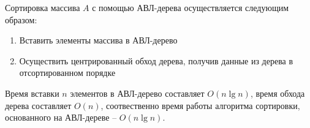 Сортировка массива $A$ с помощью АВЛ-дерева осуществляется следующим образом:
\begin{enumerate}
	\item{Вставить элементы массива в АВЛ-дерево}
	\item{Осуществить центрированный обход дерева\footnotemark, получив данные из дерева в отсортированном порядке}
\end{enumerate}


Время вставки $n$ элементов в АВЛ-дерево составляет $O(n\lg n)$, время обхода дерева составляет $O(n)$, соотвественно время работы алгоритма сортировки, основанного на АВЛ-дереве -- $O(n\lg n)$.

\newpage
